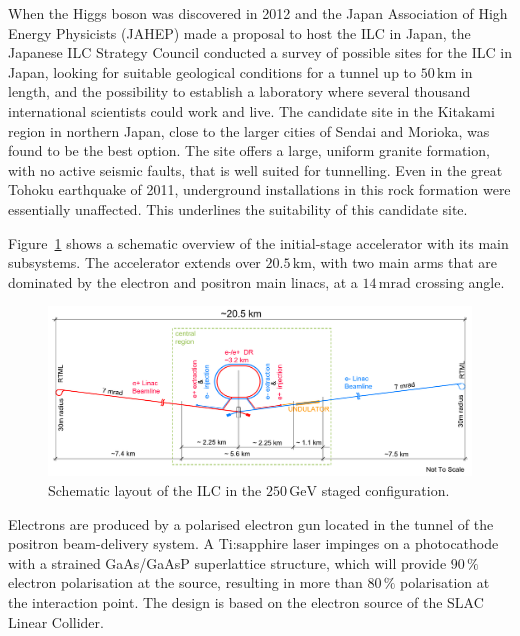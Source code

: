 \documentclass[%
 reprint,
 amsmath,amssymb,
 aps,
]{revtex4-1}
\begin{document}
When the Higgs boson was discovered in 2012 and the Japan
 Association of High Energy Physicists (JAHEP) made a proposal to host the ILC in Japan,
the Japanese ILC Strategy Council conducted a survey of possible sites
for the ILC in Japan, looking for  suitable geological conditions
 for a tunnel up to $50\,{\mathrm{km}}$ in length, and the possibility to establish a
 laboratory where several thousand international scientists could  work and live. 
The candidate site in the Kitakami region in
 northern Japan, close to the larger cities of Sendai and Morioka, 
was found to be the best option. 
The site offers a large, uniform granite formation, 
with no active seismic faults, that is well suited for tunnelling.
Even in the great Tohoku earthquake of 2011,  underground installations
in this rock formation were essentially unaffected. This  underlines
 the suitability of this candidate site. 

Figure~\ref{fig_ilc-schematic} shows a schematic overview of the
initial-stage 
accelerator with its main subsystems.
The accelerator extends over $20.5\,{\mathrm{km}}$, with two main arms that are dominated by the electron and positron main linacs, at a $14\,{\mathrm{mrad}}$ crossing angle.

 \begin{figure}[tb]
 \begin{center}
 \includegraphics[width=\hsize]{figures/TDR-machine-layout-cartoon-staged-mirror.pdf}
\caption{Schematic layout of the ILC
 in the $250\,{\mathrm{GeV}}$ staged configuration.
\label{fig_ilc-schematic}}
 \end{center}
 \vspace{-0.7cm}
 \end{figure}

Electrons are produced by a polarised electron gun located in the
tunnel of the positron beam-delivery system. A Ti:sapphire laser
impinges on a photocathode with a strained GaAs/GaAsP superlattice
structure, which will provide  $90\,\%$ electron polarisation at the
source, resulting in more than $80\,\%$ polarisation at the interaction
point. The design is based on the electron source of the SLAC
Linear Collider. 
\end{document}
